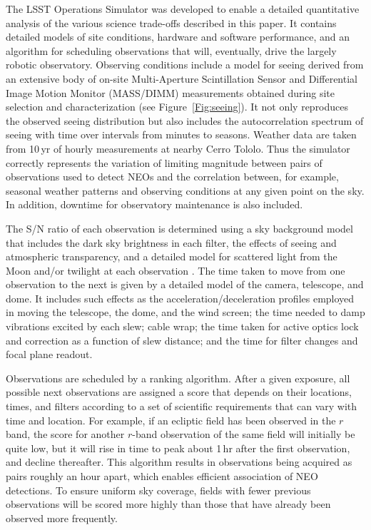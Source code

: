 The LSST Operations Simulator \citep{2014SPIE.9150E..15D} was developed to enable a
detailed quantitative analysis of the various science trade-offs described in
this paper. It contains detailed models of site conditions, hardware and
software performance, and an algorithm for scheduling observations that will,
eventually, drive the largely robotic observatory.
Observing conditions include a model for seeing derived from an extensive body
of on-site Multi-Aperture Scintillation Sensor and Differential
Image Motion Monitor (MASS/DIMM) measurements obtained during site selection and
characterization (see Figure~\ref{Fig:seeing}). It not only reproduces the
observed seeing distribution but also includes
the autocorrelation spectrum of seeing with time over intervals from minutes
to seasons. Weather data are taken from 10\,yr of hourly measurements at
nearby Cerro Tololo.
Thus the simulator correctly represents the variation of limiting
magnitude between pairs of observations used to detect NEOs and the
correlation between, for example, seasonal weather patterns and observing
conditions at any given point on the sky.  In addition, downtime for
observatory maintenance is also included.

The S/N ratio of each
observation is determined using a sky background model that includes the dark
sky brightness in each filter, the effects of seeing and atmospheric
transparency, and a detailed model for scattered light from the Moon and/or
twilight at each observation \citep{2016SPIE.9910E..1AY}. The time taken to move from one observation to
the next is given by a detailed model of the camera, telescope, and dome. It
includes such effects as the acceleration/deceleration profiles employed in
moving the telescope, the dome, and the wind screen;
the time needed to damp vibrations excited by each slew;
cable wrap; the time taken for active optics lock and correction as a function of
slew distance; and the time for filter changes and focal plane readout.

Observations are scheduled by a ranking algorithm. After a given exposure, all
possible next observations are assigned a score that depends on their locations, times,
and filters according to a set of scientific requirements that can vary with
time and location. For example, if an ecliptic field has been observed in the
$r$ band, the score for another $r$-band observation of the same field will
initially be quite low, but it will rise in time to peak about 1\,hr after
the first observation, and decline thereafter. This algorithm results in
observations being acquired as pairs roughly an hour apart, which enables
efficient association of NEO detections. To ensure uniform
sky coverage, fields with fewer previous observations will be scored more
highly than those that have already been observed more frequently.

